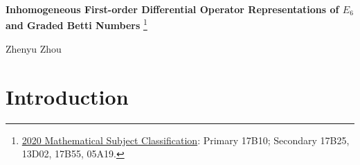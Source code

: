\documentclass[12pt]{article}
\title{}
\numberwithin{equation}{section}
\theoremstyle{definition}
\theoremstyle{remark}
\begin{document}
\baselineskip=15pt

\begin{center}{\large \bf Inhomogeneous First-order Differential Operator Representations of $E_6$ and Graded  Betti Numbers} \footnote{\href{https://mathscinet.ams.org/mathscinet/msc/msc2020.html}{2020 Mathematical Subject Classification}: Primary 17B10; Secondary 17B25, 13D02, 17B55, 05A19.}
\end{center}

\begin{center}{\large Zhenyu Zhou}\end{center}

\begin{abstract}
We realize the restricted dual Verma modules of arbitrary highest weight for the complex simple Lie algebra of type $E_6$ by inhomogeneous first-order differential operators in $36$ variables. The construction is obtained by applying Xu’s functor (2016) to the full conformal oscillator representation of $\mathfrak{o}(10)$. We construct polynomial bases for all six fundamental $E_6$-modules and obtain a finite spanning set for every finite-dimensional irreducible $E_6$-module $V(\lambda)$. The degree in $16$ selected variables gives $V(\lambda)$ a grading over the symmetric algebra of the opposite abelian nilradical. We compute its Hilbert series and graded Betti numbers, and verify the Buchsbaum-Eisenbud-Horrocks conjecture for this family. The minimal graded free resolution of $V(\lambda)$ is pure precisely when $\lambda$ is a nonnegative multiple of the Weyl vector of $E_6$. Among nonzero dominant integral $\lambda$'s, the minimum total Betti number is $435204$, attained exactly at two minuscule weights $\omega_1$ and $\omega_6$.
\vspace{0.3cm}

:\hspace{0.3cm} Lie algebra of type $E_6$; differential operators; finite-dimensional irreducible modules; singular vectors;  graded Betti numbers.
\end{abstract}

\tableofcontents



\section{Introduction}
\end{document}
